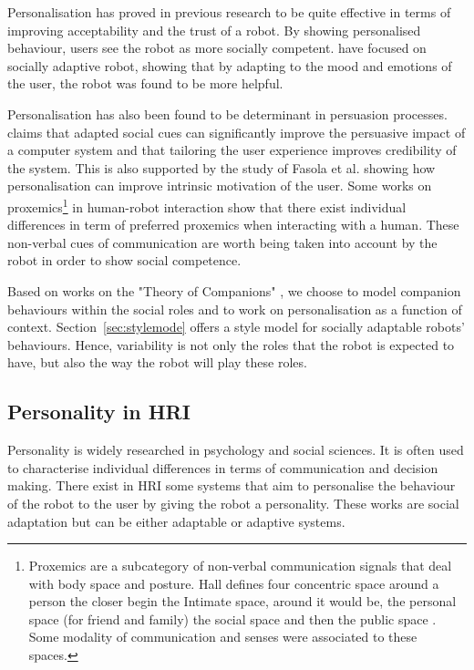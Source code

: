 \documentclass[a4paper,twocolumn]{svjour3}
\begin{document}
Personalisation has proved in previous research to be quite effective in terms of improving acceptability and the trust of a robot. 
By showing personalised behaviour, users see the robot as more socially competent.
\cite{Kuhnlenz2013} have focused on socially adaptive robot, showing that by adapting to the mood and emotions of the user, the robot was found to be more helpful.

Personalisation has also been found to be determinant in persuasion processes. 
\cite{Fogg} claims that adapted social cues can significantly improve the persuasive impact of a computer system and that tailoring the user experience improves credibility of the system. 
This is also supported by the study of Fasola et al. \cite{Fasola2012} showing how personalisation can improve intrinsic motivation of the user. 
Some works on proxemics\footnote{Proxemics are a subcategory of non-verbal communication signals that deal with body space and posture. Hall defines four concentric space around a person the closer begin the Intimate space, around it would be, the personal space (for friend and family) the social space and then the public space \cite{hall1966}. Some modality of communication and senses were associated to these spaces.} \cite{Syrdal2007} in human-robot interaction show that there exist individual differences in term of preferred proxemics when interacting with a human. 
These non-verbal cues of communication are worth being taken into account by the robot in order to show social competence. 


Based on works on the "Theory of Companions" \cite{Kramer2011}, we choose to model companion behaviours within the social roles and to work on personalisation as a function of context. 
Section~\ref{sec:stylemode} offers a style model for socially adaptable robots' behaviours.
Hence, variability is not only the roles that the robot is expected to have, but also the way the robot will play these roles.

\subsection{Personality in HRI}
Personality is widely researched in psychology and social sciences. It is often used to characterise individual differences in terms of communication and decision making. 
There exist in HRI some systems that aim to personalise the behaviour of the robot to the user by giving the robot a personality. 
These works are social adaptation but can be either adaptable or adaptive systems. 
\end{document}
